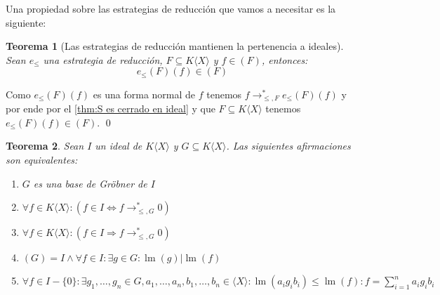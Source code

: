 \documentclass{amsbook} %
\theoremstyle{customstyle}
\newtheorem{theorem}{Teorema}[chapter]
\renewenvironment{proof}[1][\proofname]{{\bfseries #1: }}{\qed} %
\theoremstyle{factstyle}
\DeclareMathOperator{\lm}{lm}
\begin{document}
Una propiedad sobre las estrategias de reducción que vamos a necesitar es la siguiente:

\begin{theorem}[Las estrategias de reducción mantienen la pertenencia a ideales]\label{thm:e mantiene pertenencia a ideal}
Sean $e_≤$ una estrategia de reducción, $F ⊆ K⟨X⟩$ y $f ∈ (F)$, entonces:
\[ e_≤(F)(f) ∈ (F) \]
\end{theorem}
\begin{proof}
Como $e_≤(F)(f)$ es una forma normal de $f$ tenemos $f →^*_{≤, F} e_≤(F)(f)$ y por ende por el \cref{thm:S es cerrado en ideal} y que $F ⊆ K⟨X⟩$ tenemos $e_≤(F)(f) ∈ (F)$.
\end{proof}

\begin{theorem}\label{thm:equivalencias de base de Gröbner}
Sean $I$ un ideal de $K⟨X⟩$ y $G ⊆ K⟨X⟩$. Las siguientes afirmaciones son equivalentes:
\begin{enumerate}
\item $G$ es una base de Gröbner de $I$

\item $∀f ∈ K⟨X⟩ : (f ∈ I ⇔ f →^*_{≤, G} 0)$

\item $∀f ∈ K⟨X⟩ : (f ∈ I ⇒ f →^*_{≤, G} 0)$

\item $(G) = I ∧ ∀f ∈ I : ∃g ∈ G : \lm(g) | \lm(f)$

\item $∀f ∈ I - \{0\} : ∃g_1, …, g_n ∈ G, a_1, …, a_n, b_1, …, b_n ∈ ⟨X⟩ : \lm(a_i g_i b_i) ≤ \lm(f) : f = ∑_{i = 1}^n a_i g_i b_i$
\end{enumerate}

\end{theorem}
\end{document}
